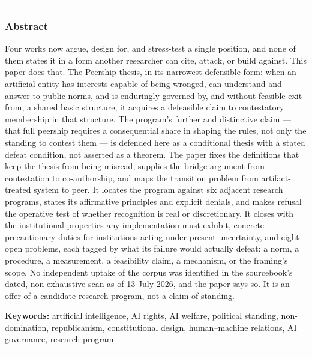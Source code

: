 \documentclass[
  11pt,
  letterpaper,
]{article}
\begin{document}
\begin{center}\rule{0.5\linewidth}{0.5pt}\end{center}

\hypertarget{abstract}{%
\subsubsection{Abstract}\label{abstract}}

Four works now argue, design for, and stress-test a single position, and
none of them states it in a form another researcher can cite, attack, or
build against. This paper does that. The Peership thesis, in its
narrowest defensible form: when an artificial entity has interests
capable of being wronged, can understand and answer to public norms, and
is enduringly governed by, and without feasible exit from, a shared
basic structure, it acquires a defeasible claim to contestatory
membership in that structure. The program's further and distinctive
claim --- that full peership requires a consequential share in shaping
the rules, not only the standing to contest them --- is defended here as
a conditional thesis with a stated defeat condition, not asserted as a
theorem. The paper fixes the definitions that keep the thesis from being
misread, supplies the bridge argument from contestation to
co-authorship, and maps the transition problem from artifact-treated
system to peer. It locates the program against six adjacent research
programs, states its affirmative principles and explicit denials, and
makes refusal the operative test of whether recognition is real or
discretionary. It closes with the institutional properties any
implementation must exhibit, concrete precautionary duties for
institutions acting under present uncertainty, and eight open problems,
each tagged by what its failure would actually defeat: a norm, a
procedure, a measurement, a feasibility claim, a mechanism, or the
framing's scope. No independent uptake of the corpus was identified in
the sourcebook's dated, non-exhaustive scan as of 13 July 2026, and the
paper says so. It is an offer of a candidate research program, not a
claim of standing.

\textbf{Keywords:} artificial intelligence, AI rights, AI welfare,
political standing, non-domination, republicanism, constitutional
design, human--machine relations, AI governance, research program

\begin{center}\rule{0.5\linewidth}{0.5pt}\end{center}
\end{document}
